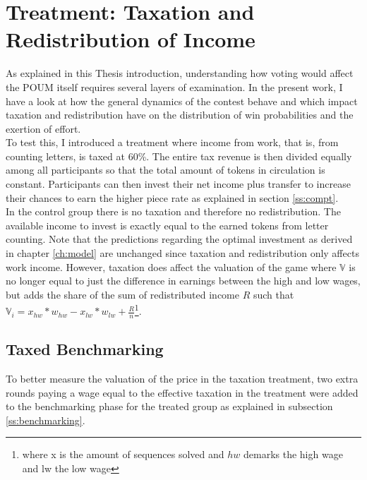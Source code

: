     
    \section{Treatment: Taxation and Redistribution of Income}
    \label{sec:treat}
    
    As explained in this Thesis introduction, understanding how voting would affect the POUM itself requires several layers of examination. In the present work, I have a look at how the general dynamics of the contest behave and which impact taxation and redistribution have on the distribution of win probabilities and the exertion of effort.\\
    
    To test this, I introduced a treatment where income from work, that is, from counting letters, is taxed at 60\%. The entire tax revenue is then divided equally among all participants so that the total amount of tokens in circulation is constant. Participants can then invest their net income plus transfer to increase their chances to earn the higher piece rate as explained in section \ref{ss:compt}.\\
    
    In the control group there is no taxation and therefore no redistribution. The available income to invest is exactly equal to the earned tokens from letter counting. Note that the predictions regarding the optimal investment as derived in chapter \ref{ch:model} are unchanged since taxation and redistribution only affects work income. However, taxation does affect the valuation of the game where $\mathbb{V}$ is no longer equal to just the difference in earnings between the high and low wages, but adds the share of the sum of redistributed income $R$ such that $\mathbb{V}_i = x_{hw}*w_{hw} - x_{lw}*w_{lw} + \frac{R}{n}$\footnote{where x is the amount of sequences solved and $hw$ demarks the high wage and {lw} the low wage}.  
    
    \subsection{Taxed Benchmarking}
    \label{ss:tax_bench}
    
    To better measure the valuation of the price in the taxation treatment, two extra rounds paying a wage equal to the effective taxation in the treatment were added to the benchmarking phase for the treated group as explained in subsection \ref{ss:benchmarking}.\\
    
